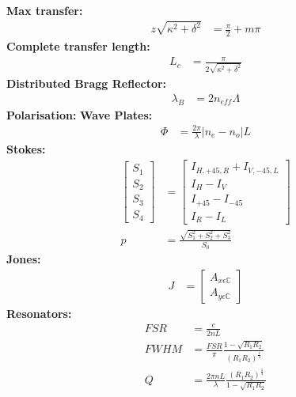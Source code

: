 \documentclass[landscape,a4paper,8pt]{article}
\begin{document}
\begin{multicols}{4}
\begin{align}
	\end{align}
	\hspace{3mm}\textbf{Max transfer:}
	\begin{align}
		z\sqrt{\kappa^2 + \delta^2} &= \frac{\pi}{2} + m\pi
	\end{align}
	\hspace{3mm}\textbf{Complete transfer length:}
	\begin{align}
		L_c &= \frac{\pi}{2\sqrt{\kappa^2 + \delta^2}}
	\end{align}
	\hspace{3mm}\textbf{Distributed Bragg Reflector:}
	\begin{align}
		\lambda_B &= 2 n_{eff} \Lambda
	\end{align}
	\textbf{Polarisation:}\newline
	\hspace{3mm}\textbf{Wave Plates:}
	\begin{align}
		\Phi &= \frac{2\pi}{\lambda} |n_e - n_o| L
	\end{align}
	\hspace{3mm}\textbf{Stokes:}
	\begin{align}
		\begin{bmatrix}
			S_1 \\ S_2 \\ S_3 \\ S_4
		\end{bmatrix}
		&=
		\begin{bmatrix}
			I_{H,+45,R} + I_{V,-45,L} \\
			I_H - I_V \\
			I_{+45} - I_{-45} \\
			I_R - I_L
		\end{bmatrix} \\
		p &= \frac{\sqrt{S_1^2 + S_2^2 + S_3^2}}{S_0}
	\end{align}
	\hspace{3mm}\textbf{Jones:}
	\begin{align}
		J &=
		\begin{bmatrix}
			A_{x\epsilon\mathbb{C}} \\ A_{y\epsilon\mathbb{C}}
		\end{bmatrix}
	\end{align}
	\textbf{Resonators:}
	\begin{align}
		FSR &= \frac{c}{2nL}\\
		FWHM &= \frac{FSR}{\pi} \frac{1 - \sqrt{R_1 R_2}}{(R_1 R_2)^\frac{1}{4}}\\
		Q &= \frac{2\pi n L}{\lambda} \frac{(R_1 R_2)^\frac{1}{4}}{1 - \sqrt{R_1 R_2}}\\

\end{align}
\end{multicols}
\end{document}

